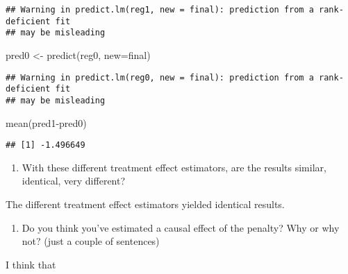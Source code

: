 \documentclass[
]{article}
\newenvironment{Shaded}{\begin{snugshade}}{\end{snugshade}}
\newcommand{\AttributeTok}[1]{\textcolor[rgb]{0.77,0.63,0.00}{#1}}
\newcommand{\FunctionTok}[1]{\textcolor[rgb]{0.00,0.00,0.00}{#1}}
\newcommand{\NormalTok}[1]{#1}
\newcommand{\OtherTok}[1]{\textcolor[rgb]{0.56,0.35,0.01}{#1}}
\newcommand{\SpecialCharTok}[1]{\textcolor[rgb]{0.00,0.00,0.00}{#1}}
\providecommand{\tightlist}{%
  \setlength{\itemsep}{0pt}\setlength{\parskip}{0pt}}
\begin{document}
\begin{verbatim}
## Warning in predict.lm(reg1, new = final): prediction from a rank-deficient fit
## may be misleading
\end{verbatim}

\begin{Shaded}
\begin{Highlighting}[]
\NormalTok{pred0 }\OtherTok{\textless{}{-}} \FunctionTok{predict}\NormalTok{(reg0, }\AttributeTok{new=}\NormalTok{final)}
\end{Highlighting}
\end{Shaded}

\begin{verbatim}
## Warning in predict.lm(reg0, new = final): prediction from a rank-deficient fit
## may be misleading
\end{verbatim}

\begin{Shaded}
\begin{Highlighting}[]
\FunctionTok{mean}\NormalTok{(pred1}\SpecialCharTok{{-}}\NormalTok{pred0)}
\end{Highlighting}
\end{Shaded}

\begin{verbatim}
## [1] -1.496649
\end{verbatim}

\begin{enumerate}
\def\labelenumi{\arabic{enumi}.}
\setcounter{enumi}{6}
\tightlist
\item
  With these different treatment effect estimators, are the results
  similar, identical, very different?
\end{enumerate}

The different treatment effect estimators yielded identical results.

\begin{enumerate}
\def\labelenumi{\arabic{enumi}.}
\setcounter{enumi}{7}
\tightlist
\item
  Do you think you've estimated a causal effect of the penalty? Why or
  why not? (just a couple of sentences)
\end{enumerate}

I think that
\end{document}
